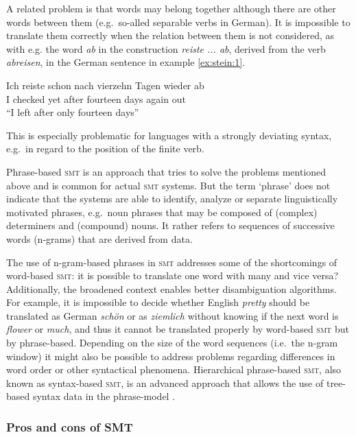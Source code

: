 \documentclass[output=paper]{LSP/langsci}
\begin{document}
A related problem is that words may belong together although there are other words between them (e.g.\ so-alled separable verbs in German). It is impossible to translate them correctly when the relation between them is not considered, as with e.g. the word \textit{ab} in the construction \textit{reiste ... ab}, derived from the verb \textit{abreisen}, in the German sentence in example \ref{ex:stein:1}.

\ea \label{ex:stein:1}
\gll Ich reiste schon nach vierzehn Tagen wieder ab\\
  I checked yet after fourteen days again out\\
\glt ``I left after only fourteen days''
\z

This is especially problematic for languages with a strongly deviating 
syntax, e.g.\ in regard to the position of the finite verb.

\label{sec:stein:3.3.2}

Phrase-based \textsc{smt} is an approach that tries to solve the problems mentioned above and is common for actual \textsc{smt} systems. But the term `phrase' does not indicate that the systems are able to identify, analyze or separate linguistically motivated phrases, e.g.\ noun phrases that may be composed of (complex) determiners and (compound) nouns. It rather refers to sequences of successive words (n-grams) that are derived from data. 

The use of n-gram-based phrases in \textsc{smt} addresses some of the shortcomings of word-based \textsc{smt}: it is possible to translate one word with many and vice versa? Additionally, the broadened context enables better disambiguation algorithms. For example, it is impossible to decide whether English \textit{pretty} should be translated as German \textit{schön} or as \textit{ziemlich} without knowing if the next word is \textit{flower} or \textit{much}, and thus it cannot be translated properly by word-based \textsc{smt} but by phrase-based. Depending on the size of the word sequences (i.e.\ the n-gram window) it might also be possible to address problems regarding differences in word order or other syntactical phenomena. Hierarchical phrase-based \textsc{smt}, also known as syntax-based \textsc{smt}, is an advanced approach that allows the use of tree-based syntax data in the phrase-model \citep{Koehn2010}.

\subsubsection{Pros and cons of SMT}\label{sec:stein:3.3.3} 
\end{document}
